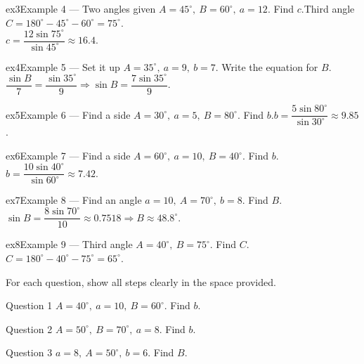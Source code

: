 \documentclass[11pt]{article}
\begin{document}
\begin{example}{ex3}{Example 4 --- Two angles given}
$A=45^\circ,\ B=60^\circ,\ a=12$. Find $c$.\soln Third angle $C=180^\circ-45^\circ-60^\circ=75^\circ$. \\ $c=\dfrac{12\sin75^\circ}{\sin45^\circ}\approx16.4$.
\end{example}

\begin{example}{ex4}{Example 5 --- Set it up}
$A=35^\circ,\ a=9,\ b=7$. Write the equation for $B$.\soln $\dfrac{\sin B}{7}=\dfrac{\sin35^\circ}{9}\Rightarrow\sin B=\dfrac{7\sin35^\circ}{9}$.
\end{example}

\begin{example}{ex5}{Example 6 --- Find a side}
$A=30^\circ,\ a=5,\ B=80^\circ$. Find $b$.\soln $b=\dfrac{5\sin80^\circ}{\sin30^\circ}\approx9.85$.
\end{example}

\begin{example}{ex6}{Example 7 --- Find a side}
$A=60^\circ,\ a=10,\ B=40^\circ$. Find $b$.\soln $b=\dfrac{10\sin40^\circ}{\sin60^\circ}\approx7.42$.
\end{example}

\begin{example}{ex7}{Example 8 --- Find an angle}
$a=10,\ A=70^\circ,\ b=8$. Find $B$.\soln $\sin B=\dfrac{8\sin70^\circ}{10}\approx0.7518\Rightarrow B\approx48.8^\circ$.
\end{example}

\begin{example}{ex8}{Example 9 --- Third angle}
$A=40^\circ,\ B=75^\circ$. Find $C$.\soln $C=180^\circ-40^\circ-75^\circ=65^\circ$.
\end{example}

\clearpage
{}
For each question, show all steps clearly in the space provided.

\begin{qbox}{Question 1}
$A=40^\circ,\ a=10,\ B=60^\circ$. Find $b$.\workspace{2.4cm}
\end{qbox}

\begin{qbox}{Question 2}
$A=50^\circ,\ B=70^\circ,\ a=8$. Find $b$.\workspace{2.4cm}
\end{qbox}

\begin{qbox}{Question 3}
$a=8,\ A=50^\circ,\ b=6$. Find $B$.\workspace{2.4cm}
\end{qbox}
\end{document}

